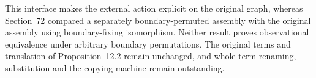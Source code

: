 This interface makes the external action explicit on the original graph,
whereas Section~72 compared a separately boundary-permuted assembly with the
original assembly using boundary-fixing isomorphism. Neither result proves
observational equivalence under arbitrary boundary permutations. The original
terms and translation of Proposition~12.2 remain unchanged, and whole-term
renaming, substitution and the copying machine remain outstanding.

